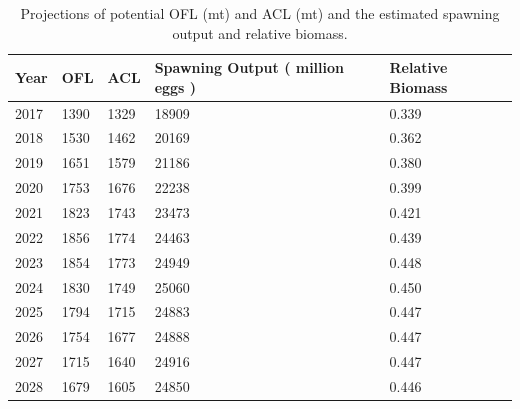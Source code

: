 \documentclass[12pt,]{article}
\begin{document}
\begin{table}[ht]
\centering
\caption{Projections of potential OFL (mt) and ACL (mt) and the estimated spawning output and relative biomass.} 
\label{tab:OFL_projection}
\begin{tabular}{lllll}
  \hline
Year & OFL & ACL & Spawning Output ( million eggs ) & Relative Biomass \\ 
  \hline
2017 & 1390 & 1329 & 18909 & 0.339 \\ 
  2018 & 1530 & 1462 & 20169 & 0.362 \\ 
  2019 & 1651 & 1579 & 21186 & 0.380 \\ 
  2020 & 1753 & 1676 & 22238 & 0.399 \\ 
  2021 & 1823 & 1743 & 23473 & 0.421 \\ 
  2022 & 1856 & 1774 & 24463 & 0.439 \\ 
  2023 & 1854 & 1773 & 24949 & 0.448 \\ 
  2024 & 1830 & 1749 & 25060 & 0.450 \\ 
  2025 & 1794 & 1715 & 24883 & 0.447 \\ 
  2026 & 1754 & 1677 & 24888 & 0.447 \\ 
  2027 & 1715 & 1640 & 24916 & 0.447 \\ 
  2028 & 1679 & 1605 & 24850 & 0.446 \\ 
   \hline
\end{tabular}
\end{table}\begin{table}[ht]
\centering
\caption{Summary of 10-year 
                                             projections beginning in 2019 
                                             for alternate states of nature based on 
                                             an axis of uncertainty for the base model. 
                                             Columns range over low, mid, and high
                                             states of nature, and rows range over different 
                                             assumptions of catch levels. An entry of "--" 
                                             indicates that the stock is driven to very low 
                                             abundance under the particular scenario.} 
\label{tab:Decision_table_mod1}
\end{table}
\end{document}

